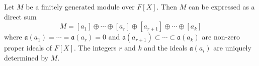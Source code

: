 Let $M$ be a finitely generated module over $F[X]$. Then $M$ can be expressed as a direct sum
$$M = [a_1] \oplus \cdots \oplus [a_r] \oplus [a_{r+1}] \oplus \cdots \oplus [a_k]$$
where $\mathfrak{a}(a_1) = \cdots = \mathfrak{a}(a_r) = 0$ and $\mathfrak{a}(a_{r+1}) \subset \cdots \subset \mathfrak{a}(a_k)$ are non-zero proper ideals of $F[X]$. The integers $r$ and $k$ and the ideals $\mathfrak{a}(a_i)$ are uniquely determined by $M$.
